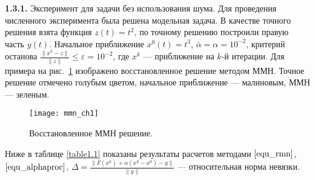 {\bfseries 1.3.1.} Эксперимент для задачи без использования шума. Для проведения численного эксперимента была решена модельная задача. В качестве точного решения взята функция $z(t)=t^2$, по точному решению построили правую часть $y(t)$.  Начальное приближение $x^0(t)=t^3$, $\bar\alpha=\alpha=10^{-2}$, критерий останова $\frac{\|x^k-z\|}{\|z\|}\le\varepsilon=10^{-2}$, где $x^k$ --- приближение на $k$-й итерации. Для примера на рис.~\ref{fig:mmn_ch1} изображено восстановленное решение методом ММН. Точное решение отмечено голубым цветом, начальное приближение --- малиновым, ММН --- зеленым. 
\begin{figure}[h]
	\centering
	\texttt{[image: mmn\_ch1]}
	\caption{Восстановленное ММН решение.}
	\label{fig:mmn_ch1}
\end{figure}
Ниже в таблице \ref{table1.1} показаны результаты расчетов методами $\eqref{equ_rmn}$, $\eqref{equ_alphaproc}$, $\Delta=\frac{\|F(x^k)+\alpha(x^k-x^0)-y\|}{\|y\|}$ --- относительная норма невязки. 
